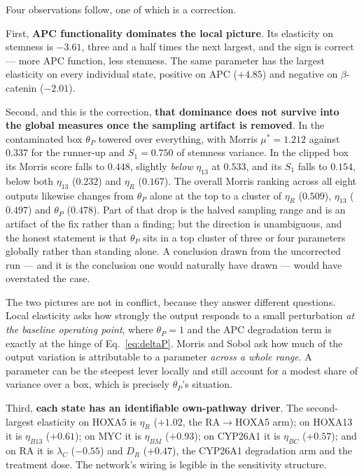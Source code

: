\documentclass[11pt]{article}
\newcommand{\bcat}{$\beta$-\hspace{0pt}catenin}
\newcommand{\thP}{\theta_P}
\begin{document}
Four observations follow, one of which is a correction.

First, \textbf{APC functionality dominates the local picture}. Its elasticity on
stemness is $-3.61$, three and a half times the next largest, and the sign is
correct --- more APC function, less stemness. The same parameter has the largest
elasticity on every individual state, positive on APC ($+4.85$) and negative on
\bcat{} ($-2.01$).

Second, and this is the correction, \textbf{that dominance does not survive
into the global measures once the sampling artifact is removed}. In the
contaminated box $\thP$ towered over everything, with Morris $\mu^* = 1.212$
against $0.337$ for the runner-up and $S_1 = 0.750$ of stemness variance. In
the clipped box its Morris score falls to $0.448$, slightly \emph{below}
$\eta_{13}$ at $0.533$, and its $S_1$ falls to $0.154$, below both $\eta_{13}$
($0.232$) and $\eta_R$ ($0.167$). The overall Morris ranking across all eight
outputs likewise changes from $\thP$ alone at the top to a cluster of
$\eta_R$ ($0.509$), $\eta_{13}$ ($0.497$) and $\thP$ ($0.478$). Part of that
drop is the halved sampling range and is an artifact of the fix rather than a
finding; but the direction is unambiguous, and the honest statement is that
$\thP$ sits in a top cluster of three or four parameters globally rather than
standing alone. A conclusion drawn from the uncorrected run --- and it is the
conclusion one would naturally have drawn --- would have overstated the case.

The two pictures are not in conflict, because they answer different questions.
Local elasticity asks how strongly the output responds to a small perturbation
\emph{at the baseline operating point}, where $\thP = 1$ and the APC
degradation term is exactly at the hinge of Eq.~\eqref{eq:deltaP}. Morris and
Sobol ask how much of the output variation is attributable to a parameter
\emph{across a whole range}. A parameter can be the steepest lever locally and
still account for a modest share of variance over a box, which is precisely
$\thP$'s situation.

Third, \textbf{each state has an identifiable own-pathway driver}. The
second-largest elasticity on HOXA5 is $\eta_R$ ($+1.02$, the RA$\to$HOXA5 arm);
on HOXA13 it is $\eta_{B13}$ ($+0.61$); on MYC it is $\eta_{BM}$ ($+0.93$); on
CYP26A1 it is $\eta_{BC}$ ($+0.57$); and on RA it is $\lambda_C$ ($-0.55$) and
$D_R$ ($+0.47$), the CYP26A1 degradation arm and the treatment dose. The
network's wiring is legible in the sensitivity structure.
\end{document}
